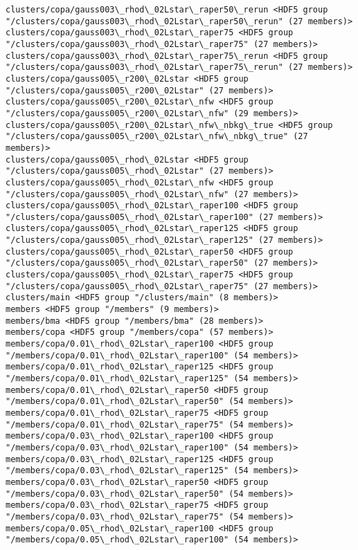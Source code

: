 \documentclass[11pt]{article}
\begin{document}
\begin{Verbatim}[commandchars=\\\{\}]
clusters/copa/gauss003\_rhod\_02Lstar\_raper50\_rerun <HDF5 group "/clusters/copa/gauss003\_rhod\_02Lstar\_raper50\_rerun" (27 members)>
clusters/copa/gauss003\_rhod\_02Lstar\_raper75 <HDF5 group "/clusters/copa/gauss003\_rhod\_02Lstar\_raper75" (27 members)>
clusters/copa/gauss003\_rhod\_02Lstar\_raper75\_rerun <HDF5 group "/clusters/copa/gauss003\_rhod\_02Lstar\_raper75\_rerun" (27 members)>
clusters/copa/gauss005\_r200\_02Lstar <HDF5 group "/clusters/copa/gauss005\_r200\_02Lstar" (27 members)>
clusters/copa/gauss005\_r200\_02Lstar\_nfw <HDF5 group "/clusters/copa/gauss005\_r200\_02Lstar\_nfw" (29 members)>
clusters/copa/gauss005\_r200\_02Lstar\_nfw\_nbkg\_true <HDF5 group "/clusters/copa/gauss005\_r200\_02Lstar\_nfw\_nbkg\_true" (27 members)>
clusters/copa/gauss005\_rhod\_02Lstar <HDF5 group "/clusters/copa/gauss005\_rhod\_02Lstar" (27 members)>
clusters/copa/gauss005\_rhod\_02Lstar\_nfw <HDF5 group "/clusters/copa/gauss005\_rhod\_02Lstar\_nfw" (27 members)>
clusters/copa/gauss005\_rhod\_02Lstar\_raper100 <HDF5 group "/clusters/copa/gauss005\_rhod\_02Lstar\_raper100" (27 members)>
clusters/copa/gauss005\_rhod\_02Lstar\_raper125 <HDF5 group "/clusters/copa/gauss005\_rhod\_02Lstar\_raper125" (27 members)>
clusters/copa/gauss005\_rhod\_02Lstar\_raper50 <HDF5 group "/clusters/copa/gauss005\_rhod\_02Lstar\_raper50" (27 members)>
clusters/copa/gauss005\_rhod\_02Lstar\_raper75 <HDF5 group "/clusters/copa/gauss005\_rhod\_02Lstar\_raper75" (27 members)>
clusters/main <HDF5 group "/clusters/main" (8 members)>
members <HDF5 group "/members" (9 members)>
members/bma <HDF5 group "/members/bma" (28 members)>
members/copa <HDF5 group "/members/copa" (57 members)>
members/copa/0.01\_rhod\_02Lstar\_raper100 <HDF5 group "/members/copa/0.01\_rhod\_02Lstar\_raper100" (54 members)>
members/copa/0.01\_rhod\_02Lstar\_raper125 <HDF5 group "/members/copa/0.01\_rhod\_02Lstar\_raper125" (54 members)>
members/copa/0.01\_rhod\_02Lstar\_raper50 <HDF5 group "/members/copa/0.01\_rhod\_02Lstar\_raper50" (54 members)>
members/copa/0.01\_rhod\_02Lstar\_raper75 <HDF5 group "/members/copa/0.01\_rhod\_02Lstar\_raper75" (54 members)>
members/copa/0.03\_rhod\_02Lstar\_raper100 <HDF5 group "/members/copa/0.03\_rhod\_02Lstar\_raper100" (54 members)>
members/copa/0.03\_rhod\_02Lstar\_raper125 <HDF5 group "/members/copa/0.03\_rhod\_02Lstar\_raper125" (54 members)>
members/copa/0.03\_rhod\_02Lstar\_raper50 <HDF5 group "/members/copa/0.03\_rhod\_02Lstar\_raper50" (54 members)>
members/copa/0.03\_rhod\_02Lstar\_raper75 <HDF5 group "/members/copa/0.03\_rhod\_02Lstar\_raper75" (54 members)>
members/copa/0.05\_rhod\_02Lstar\_raper100 <HDF5 group "/members/copa/0.05\_rhod\_02Lstar\_raper100" (54 members)>

\end{Verbatim}
\end{document}
